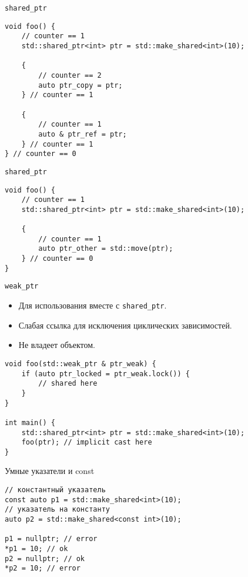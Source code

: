 \documentclass{beamer}
\begin{document}
\begin{frame}[fragile]{\texttt{shared\_ptr}}
    \begin{lstlisting}
void foo() {
    // counter == 1
    std::shared_ptr<int> ptr = std::make_shared<int>(10);

    {
        // counter == 2
        auto ptr_copy = ptr;
    } // counter == 1

    {
        // counter == 1
        auto & ptr_ref = ptr;
    } // counter == 1
} // counter == 0
    \end{lstlisting}
\end{frame}

\begin{frame}[fragile]{\texttt{shared\_ptr}}
    \begin{lstlisting}
void foo() {
    // counter == 1
    std::shared_ptr<int> ptr = std::make_shared<int>(10);

    {
        // counter == 1
        auto ptr_other = std::move(ptr);
    } // counter == 0
}
    \end{lstlisting}
\end{frame}

\begin{frame}[fragile]{\texttt{weak\_ptr}}
    \begin{itemize}
        \item Для использования вместе с \texttt{shared\_ptr}.
        \item Слабая ссылка для исключения циклических зависимостей.
        \item Не владеет объектом.
    \end{itemize}

    \begin{lstlisting}
void foo(std::weak_ptr & ptr_weak) {
    if (auto ptr_locked = ptr_weak.lock()) {
        // shared here
    }
}

int main() {
    std::shared_ptr<int> ptr = std::make_shared<int>(10);
    foo(ptr); // implicit cast here
}
    \end{lstlisting}
\end{frame}

\begin{frame}[fragile]{Умные указатели и const}
    \begin{itemize}
\begin{lstlisting}
// константный указатель
const auto p1 = std::make_shared<int>(10);
// указатель на константу
auto p2 = std::make_shared<const int>(10);

p1 = nullptr; // error
*p1 = 10; // ok
p2 = nullptr; // ok
*p2 = 10; // error
\end{lstlisting}
    \end{itemize}
\end{frame}
\end{document}
